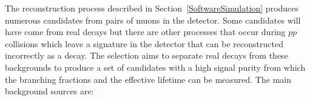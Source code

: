 
The reconstruction process described in Section~\ref{SoftwareSimulation} produces numerous \bmumu candidates from pairs of muons in the detector. Some candidates will have come from real \bmumu decays but there are other processes that occur during $pp$ collisions which leave a signature in the detector that can be reconstructed incorrectly as a \bmumu decay. %
The selection aims to separate real \bmumu decays from these backgrounds to produce a set of \bmumu candidates with a high signal purity from which the branching fractions and the effective lifetime can be measured.
The main background sources are:
